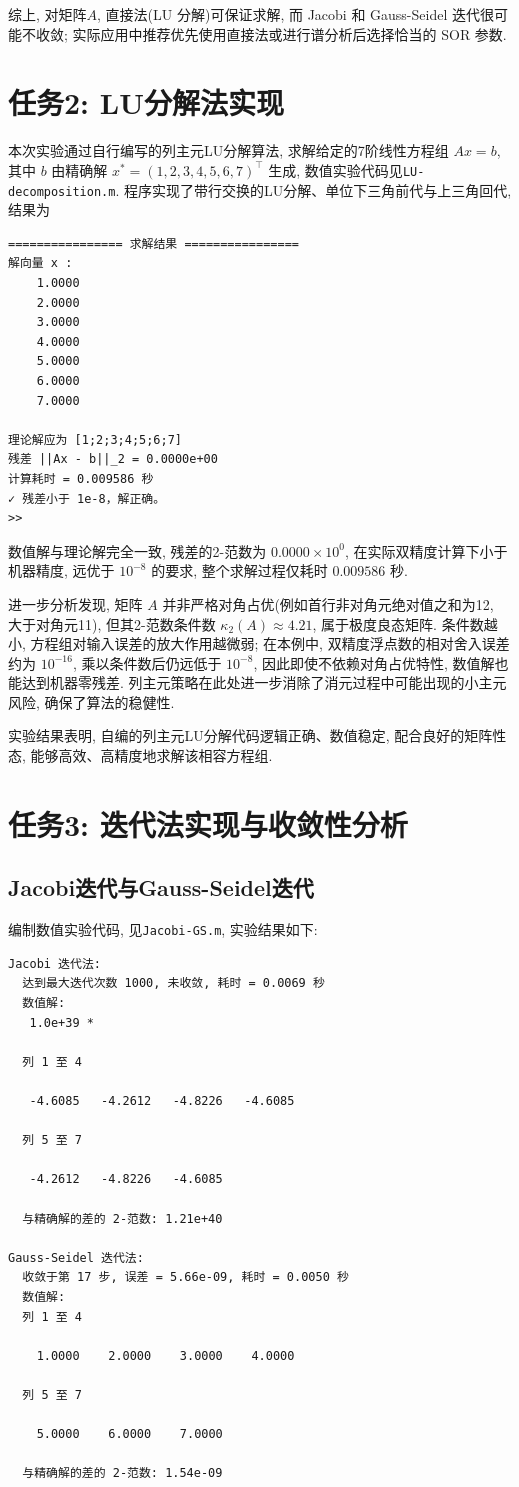 \documentclass[zihao=-4,a4paper]{ctexart}
\begin{document}
综上, 对矩阵$A$, 直接法(LU 分解)可保证求解, 而 Jacobi 和 Gauss-Seidel 迭代很可能不收敛; 实际应用中推荐优先使用直接法或进行谱分析后选择恰当的 SOR 参数. 
\section{任务2: LU分解法实现}
本次实验通过自行编写的列主元LU分解算法, 求解给定的7阶线性方程组 $Ax = b$, 其中 $b$ 由精确解 $x^* = (1,2,3,4,5,6,7)^\top$ 生成, 数值实验代码见\texttt{LU-decomposition.m}. 程序实现了带行交换的LU分解、单位下三角前代与上三角回代, 结果为
\begin{lstlisting}
================ 求解结果 ================
解向量 x :
    1.0000
    2.0000
    3.0000
    4.0000
    5.0000
    6.0000
    7.0000

理论解应为 [1;2;3;4;5;6;7]
残差 ||Ax - b||_2 = 0.0000e+00
计算耗时 = 0.009586 秒
✓ 残差小于 1e-8，解正确。
>> 
\end{lstlisting}

数值解与理论解完全一致, 残差的2-范数为 $0.0000 \times 10^{0}$, 在实际双精度计算下小于机器精度, 远优于 $10^{-8}$ 的要求, 整个求解过程仅耗时 $0.009586$ 秒. 

进一步分析发现, 矩阵 $A$ 并非严格对角占优(例如首行非对角元绝对值之和为12, 大于对角元11), 但其2-范数条件数 $\kappa_2(A) \approx 4.21$, 属于极度良态矩阵. 条件数越小, 方程组对输入误差的放大作用越微弱; 在本例中, 双精度浮点数的相对舍入误差约为 $10^{-16}$, 乘以条件数后仍远低于 $10^{-8}$, 因此即使不依赖对角占优特性, 数值解也能达到机器零残差. 列主元策略在此处进一步消除了消元过程中可能出现的小主元风险, 确保了算法的稳健性. 

实验结果表明, 自编的列主元LU分解代码逻辑正确、数值稳定, 配合良好的矩阵性态, 能够高效、高精度地求解该相容方程组.

\section{任务3: 迭代法实现与收敛性分析}
\subsection{Jacobi迭代与Gauss-Seidel迭代}
编制数值实验代码, 见\texttt{Jacobi-GS.m}, 实验结果如下:
\begin{lstlisting}
Jacobi 迭代法:
  达到最大迭代次数 1000, 未收敛, 耗时 = 0.0069 秒
  数值解: 
   1.0e+39 *

  列 1 至 4

   -4.6085   -4.2612   -4.8226   -4.6085

  列 5 至 7

   -4.2612   -4.8226   -4.6085

  与精确解的差的 2-范数: 1.21e+40

Gauss-Seidel 迭代法:
  收敛于第 17 步, 误差 = 5.66e-09, 耗时 = 0.0050 秒
  数值解: 
  列 1 至 4

    1.0000    2.0000    3.0000    4.0000

  列 5 至 7

    5.0000    6.0000    7.0000

  与精确解的差的 2-范数: 1.54e-09
\end{lstlisting}
\end{document}

